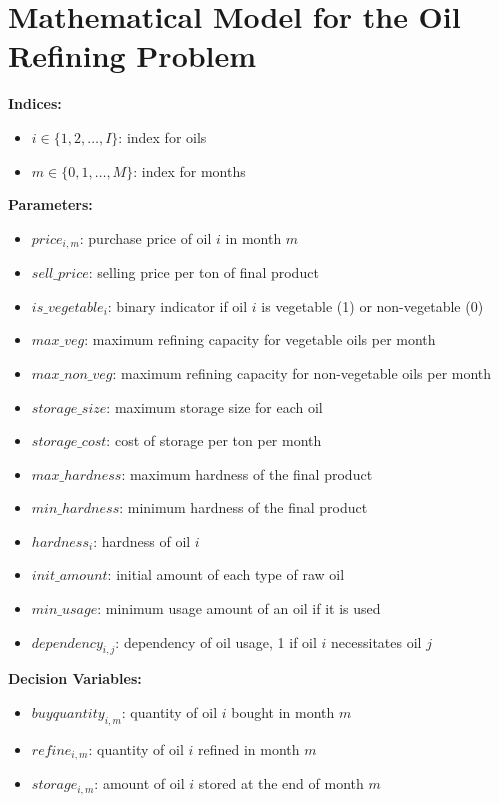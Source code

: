 \documentclass{article}
\begin{document}
\section*{Mathematical Model for the Oil Refining Problem}

\textbf{Indices:}
\begin{itemize}
    \item $i \in \{1, 2, \ldots, I\}$: index for oils
    \item $m \in \{0, 1, \ldots, M\}$: index for months
\end{itemize}

\textbf{Parameters:}
\begin{itemize}
    \item $price_{i,m}$: purchase price of oil $i$ in month $m$
    \item $sell\_price$: selling price per ton of final product
    \item $is\_vegetable_{i}$: binary indicator if oil $i$ is vegetable (1) or non-vegetable (0)
    \item $max\_veg$: maximum refining capacity for vegetable oils per month
    \item $max\_non\_veg$: maximum refining capacity for non-vegetable oils per month
    \item $storage\_size$: maximum storage size for each oil
    \item $storage\_cost$: cost of storage per ton per month
    \item $max\_hardness$: maximum hardness of the final product
    \item $min\_hardness$: minimum hardness of the final product
    \item $hardness_{i}$: hardness of oil $i$
    \item $init\_amount$: initial amount of each type of raw oil
    \item $min\_usage$: minimum usage amount of an oil if it is used
    \item $dependency_{i,j}$: dependency of oil usage, 1 if oil $i$ necessitates oil $j$
\end{itemize}

\textbf{Decision Variables:}
\begin{itemize}
    \item $buyquantity_{i,m}$: quantity of oil $i$ bought in month $m$
    \item $refine_{i,m}$: quantity of oil $i$ refined in month $m$
    \item $storage_{i,m}$: amount of oil $i$ stored at the end of month $m$
\end{itemize}
\end{document}
